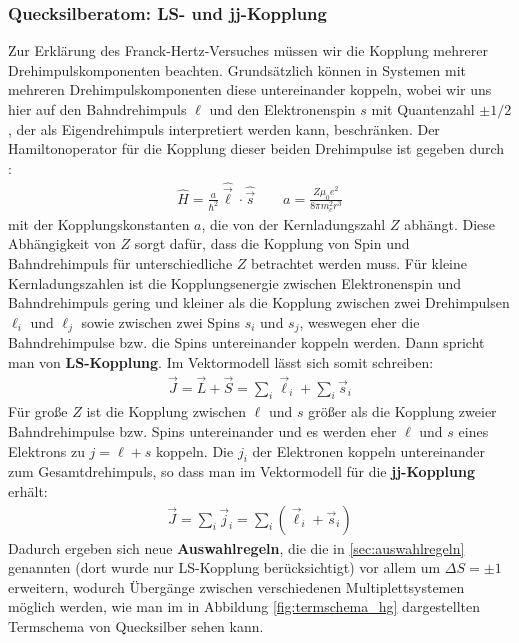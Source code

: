\documentclass[11pt, a4paper]{article}
\begin{document}
\subsubsection{Quecksilberatom: LS- und jj-Kopplung}
Zur Erklärung des Franck-Hertz-Versuches müssen wir die Kopplung mehrerer Drehimpulskomponenten beachten.
Grundsätzlich können in Systemen mit mehreren Drehimpulskomponenten diese untereinander koppeln, wobei wir uns hier auf den Bahndrehimpuls $\ell$ und den Elektronenspin $s$ mit Quantenzahl $\pm1/2$, der als Eigendrehimpuls interpretiert werden kann, beschränken.
Der Hamiltonoperator für die Kopplung dieser beiden Drehimpulse ist gegeben durch \cite{haken_wolf}:
\begin{align*}
\hat{H}=\frac{a}{\hbar^2}\hat{\vec{\ell}}\cdot\hat{\vec{s}}\qquad a=\frac{Z\mu_0 e^2}{8\pi m_e^2 r^3}
\end{align*}
mit der Kopplungskonstanten $a$, die von der Kernladungszahl $Z$ abhängt.
Diese Abhängigkeit von $Z$ sorgt dafür, dass die Kopplung von Spin und Bahndrehimpuls für unterschiedliche $Z$ betrachtet werden muss.
Für kleine Kernladungszahlen ist die Kopplungsenergie zwischen Elektronenspin und Bahndrehimpuls gering und kleiner als die Kopplung zwischen zwei Drehimpulsen $\ell_i$ und $\ell_j$ sowie zwischen zwei Spins $s_i$ und $s_j$, weswegen eher die Bahndrehimpulse bzw. die Spins untereinander koppeln werden.
Dann spricht man von \textbf{LS-Kopplung}.
Im Vektormodell lässt sich somit schreiben:
\begin{align*}
\vec{J}=\vec{L}+\vec{S}=\sum_i\vec{\ell}_i+\sum_i\vec{s}_i
\end{align*}
Für große $Z$ ist die Kopplung zwischen $\ell$ und $s$ größer als die Kopplung zweier Bahndrehimpulse bzw. Spins untereinander und es werden eher $\ell$ und $s$ eines Elektrons zu $j=\ell+s$ koppeln.
Die $j_i$ der Elektronen koppeln untereinander zum Gesamtdrehimpuls, so dass man im Vektormodell für die \textbf{jj-Kopplung} erhält:
\begin{align*}
\vec{J}=\sum_i\vec{j}_i=\sum_i\left(\vec{\ell}_i+\vec{s}_i\right)
\end{align*}
Dadurch ergeben sich neue \textbf{Auswahlregeln}, die die in \ref{sec:auswahlregeln} genannten (dort wurde nur LS-Kopplung berücksichtigt) vor allem um $\Delta S=\pm1$ erweitern, wodurch Übergänge zwischen verschiedenen Multiplettsystemen möglich werden, wie man im in Abbildung \ref{fig:termschema_hg} dargestellten Termschema von Quecksilber sehen kann.
\end{document}
